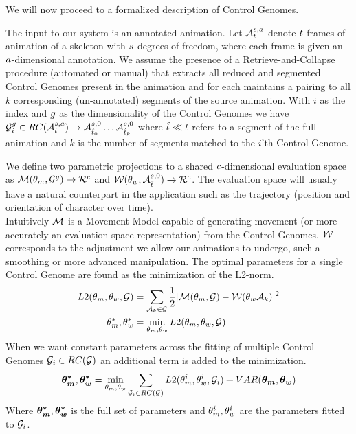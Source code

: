 We will now proceed to a formalized description of Control Genomes.

The input to our system is an annotated animation. Let $\mathcal{A}^{s,a}_t$ denote $t$ frames of animation of a skeleton with $s$ degrees of freedom, where each frame is given an $a$-dimensional annotation. We assume the presence of a Retrieve-and-Collapse procedure (automated or manual) that extracts all reduced and segmented Control Genomes present in the animation and for each maintains a pairing to all $k$ corresponding (un-annotated) segments of the source animation. With $i$ as the index and $g$ as the dimensionality of the Control Genomes we have $\mathcal{G}^g_i\in{RC}(\mathcal{A}^{s,a}_t)\rightarrow\mathcal{A}^{s,0}_{{\hat{t}}_0}\ldots\mathcal{A}^{s,0}_{{\hat{t}}_k}$ where ${\hat{t}}\ll t$ refers to a segment of the full animation and $k$ is the number of segments matched to the $i$'th Control Genome.


We define two parametric projections to a shared $c$-dimensional evaluation space as $\mathcal{M}(\theta_{m},\mathcal{G}^{g}) \rightarrow \mathcal{R}^{c}$ and $\mathcal{W}(\theta_{w},\mathcal{A}_{{\hat{t}}}^{s,0}) \rightarrow \mathcal{R}^{c}$. The evaluation space will usually have a natural counterpart in the application such as the trajectory (position and orientation of character over time).\\
Intuitively $\mathcal{M}$ is a Movement Model capable of generating movement (or more accurately an evaluation space representation) from the Control Genomes. $\mathcal{W}$ corresponds to the adjustment we allow our animations to undergo, such a smoothing or more advanced manipulation. The optimal parameters for a single Control Genome are found as the minimization of the L2-norm.
\begin{subequations}
\begin{align}
    {L2}(\theta_{m},\theta_{w},\mathcal{G})&=\sum_{\mathcal{A}_k\in\mathcal{G}}{\frac{1}{2}|\mathcal{M}(\theta_{m},\mathcal{G})-\mathcal{W}(\theta_{w}\mathcal{A}_k)|^2}\label{eq:optim:single}\\
    \theta_{m}^*,\theta_{w}^*&=\min_{\theta_{m},\theta_{w}}{{L2}(\theta_{m},\theta_{w},\mathcal{G})}
\end{align}
\end{subequations}
When we want constant parameters across the fitting of multiple Control Genomes $\mathcal{G}_i\in{RC}(\mathcal{G})$ an additional term is added to the minimization. 
\begin{equation}
    \boldsymbol{\theta_{m}^* },\boldsymbol{\theta_{w}^* }=\min_{\theta_{m},\theta_{w}}{\sum_{\mathcal{G}_i\in{RC}(\mathcal{G})}{{L2}(\theta_{m}^i,\theta_{w}^i,\mathcal{G}_i)}}+VAR(\boldsymbol{\theta_{m} },\boldsymbol{\theta_{w} })
\end{equation}
Where $\boldsymbol{\theta_{m}^* },\boldsymbol{\theta_{w}^* }$ is the full set of parameters and $\theta_{m}^i,\theta_{w}^i$ are the parameters fitted to $\mathcal{G}_i$.

